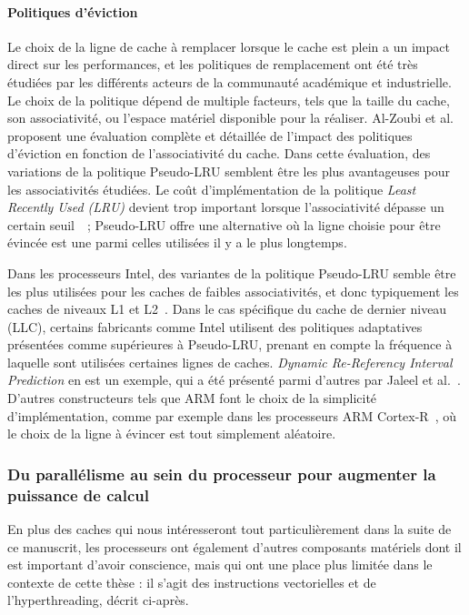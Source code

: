 \paragraph{Politiques d'éviction}

Le choix de la ligne de cache à remplacer lorsque le cache est plein a un impact direct sur les performances, et les politiques de remplacement ont été très étudiées par les différents acteurs de la communauté académique et industrielle.
Le choix de la politique dépend de multiple facteurs, tels que la taille du cache, son associativité, ou l'espace matériel disponible pour la réaliser.
Al-Zoubi et al.~\cite{Al-Zoubi2004} proposent une évaluation complète et détaillée de l'impact des politiques d'éviction en fonction de l'associativité du cache.
Dans cette évaluation, des variations de la politique Pseudo-LRU semblent être les plus avantageuses pour les associativités étudiées.
Le coût d'implémentation de la politique \emph{Least Recently Used (LRU)} devient trop important lorsque l'associativité dépasse un certain seuil~\cite{Kedzierski2010}~; Pseudo-LRU offre une alternative où la ligne choisie pour être évincée est une parmi celles utilisées il y a le plus longtemps.

Dans les processeurs Intel, des variantes de la politique Pseudo-LRU semble être les plus utilisées pour les caches de faibles associativités, et donc typiquement les caches de niveaux L1 et L2~\cite{Abel2014,IntelXeonPhi2014}.
Dans le cas spécifique du cache de dernier niveau (LLC), certains fabricants comme Intel utilisent des politiques adaptatives présentées comme supérieures à Pseudo-LRU, prenant en compte la fréquence à laquelle sont utilisées certaines lignes de caches.
\emph{Dynamic Re-Referency Interval Prediction} en est un exemple, qui a été présenté parmi d'autres par Jaleel et al.~\cite{Jaleel2010}.
D'autres constructeurs tels que ARM font le choix de la simplicité d'implémentation, comme par exemple dans les processeurs ARM Cortex-R~\cite{ARM-Cortex-R}, où le choix de la ligne à évincer est tout simplement aléatoire.

\subsubsection{Du parallélisme au sein du processeur pour augmenter la puissance de calcul}\label{sec:context:numa:node}

En plus des caches qui nous intéresseront tout particulièrement dans la suite de ce manuscrit, les processeurs ont également d'autres composants matériels dont il est important d'avoir conscience, mais qui ont une place plus limitée dans le contexte de cette thèse : il s'agit des instructions vectorielles et de l'hyperthreading, décrit ci-après.

